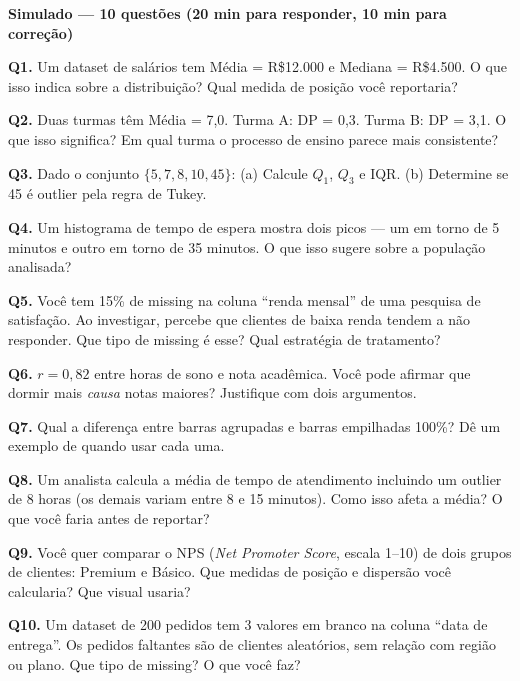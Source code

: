 \begin{BoardBox}
\textbf{Simulado — 10 questões (20 min para responder, 10 min para correção)}

\textbf{Q1.} Um dataset de salários tem Média = R\$12.000 e Mediana = R\$4.500.
O que isso indica sobre a distribuição? Qual medida de posição você reportaria?

\textbf{Q2.} Duas turmas têm Média = 7,0. Turma A: DP = 0,3. Turma B: DP = 3,1.
O que isso significa? Em qual turma o processo de ensino parece mais consistente?

\textbf{Q3.} Dado o conjunto $\{5, 7, 8, 10, 45\}$:
(a) Calcule $Q_1$, $Q_3$ e IQR.
(b) Determine se 45 é outlier pela regra de Tukey.

\textbf{Q4.} Um histograma de tempo de espera mostra dois picos — um em torno de
5 minutos e outro em torno de 35 minutos. O que isso sugere sobre a população analisada?

\textbf{Q5.} Você tem 15\% de missing na coluna ``renda mensal'' de uma pesquisa
de satisfação. Ao investigar, percebe que clientes de baixa renda tendem a não
responder. Que tipo de missing é esse? Qual estratégia de tratamento?

\textbf{Q6.} $r = 0,82$ entre horas de sono e nota acadêmica. Você pode afirmar
que dormir mais \emph{causa} notas maiores? Justifique com dois argumentos.

\textbf{Q7.} Qual a diferença entre barras agrupadas e barras empilhadas 100\%?
Dê um exemplo de quando usar cada uma.

\textbf{Q8.} Um analista calcula a média de tempo de atendimento incluindo um
outlier de 8 horas (os demais variam entre 8 e 15 minutos). Como isso afeta a
média? O que você faria antes de reportar?

\textbf{Q9.} Você quer comparar o NPS (\textit{Net Promoter Score}, escala 1–10)
de dois grupos de clientes: Premium e Básico. Que medidas de posição e dispersão
você calcularia? Que visual usaria?

\textbf{Q10.} Um dataset de 200 pedidos tem 3 valores em branco na coluna
``data de entrega''. Os pedidos faltantes são de clientes aleatórios, sem relação
com região ou plano. Que tipo de missing? O que você faz?
\end{BoardBox}

